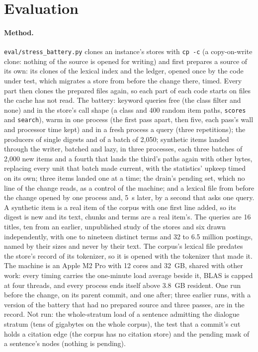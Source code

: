 \documentclass[11pt]{article}
\theoremstyle{plain}
\theoremstyle{definition}
\theoremstyle{remark}
\newcommand{\code}[1]{\texttt{#1}}
\newcommand{\nPaths}{400}
\newcommand{\nBatch}{2{,}050}
\newcommand{\nQueries}{16}
\begin{document}
\section{Evaluation}\label{sec:eval}

\paragraph{Method.} \code{eval/stress\_battery.py} clones an instance's stores with \code{cp -c}
(a copy-on-write clone: nothing of the source is opened for writing) and first prepares a source of
its own: its clones of the lexical index and the ledger, opened once by the code under test, which
migrates a store from before the change there, timed. Every part then clones the prepared files
again, so each part of each code starts on files the cache has not read. The battery: keyword
queries free (the class filter and none) and in the store's call shape (a class and \nPaths{} random
item paths, \code{scores} and \code{search}), warm in one process (the first pass apart, then five,
each pass's wall and processor time kept) and in a fresh process a query (three repetitions); the
producers of single digests and of a batch of \nBatch{}; synthetic items landed through the writer,
batched and lazy, in three processes, each three batches of 2{,}000 new items and a fourth that lands
the third's paths again with other bytes, replacing every unit that batch made current, with the
statistics' upkeep timed on its own; three items landed one at a time; the drain's pending set,
which no line of the change reads, as a control of the machine; and a lexical file from before the
change opened by one process and, 5~s later, by a second that asks one query. A synthetic item is a
real item of the corpus with one first line added, so its digest is new and its text, chunks and
terms are a real item's. The queries are \nQueries{} titles, ten from an earlier, unpublished study
of the stores and six drawn independently, with one to nineteen distinct terms and 32 to 6.5
million postings, named by their sizes and never by their text. The corpus's lexical file predates
the store's record of its tokenizer, so it is opened with the tokenizer that made it. The machine
is an Apple M2 Pro with 12 cores and 32~GB, shared with other work: every timing carries the
one-minute load average beside it, BLAS is capped at four threads, and every process ends itself
above 3.8~GB resident. One run before the change, on its parent commit, and one after; three
earlier runs, with a version of the battery that had no prepared source and three passes, are in
the record. Not run: the whole-stratum load of a sentence admitting the dialogue stratum (tens of
gigabytes on the whole corpus), the test that a commit's cut holds a citation edge (the corpus has
no citation store) and the pending mask of a sentence's nodes (nothing is pending).
\end{document}
